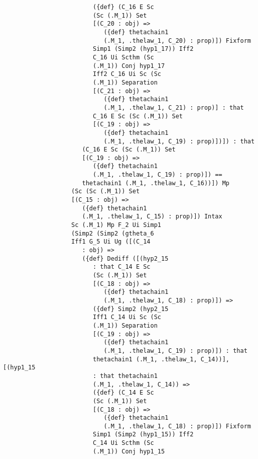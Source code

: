 \documentclass[12pt]{article}
\begin{document}
\begin{verbatim}
                         ({def} (C_16 E Sc 
                         (Sc (.M_1)) Set 
                         [(C_20 : obj) => 
                            ({def} thetachain1 
                            (.M_1, .thelaw_1, C_20) : prop)]) Fixform 
                         Simp1 (Simp2 (hyp1_17)) Iff2 
                         C_16 Ui Scthm (Sc 
                         (.M_1)) Conj hyp1_17 
                         Iff2 C_16 Ui Sc (Sc 
                         (.M_1)) Separation 
                         [(C_21 : obj) => 
                            ({def} thetachain1 
                            (.M_1, .thelaw_1, C_21) : prop)] : that 
                         C_16 E Sc (Sc (.M_1)) Set 
                         [(C_19 : obj) => 
                            ({def} thetachain1 
                            (.M_1, .thelaw_1, C_19) : prop)])]) : that 
                      (C_16 E Sc (Sc (.M_1)) Set 
                      [(C_19 : obj) => 
                         ({def} thetachain1 
                         (.M_1, .thelaw_1, C_19) : prop)]) == 
                      thetachain1 (.M_1, .thelaw_1, C_16))]) Mp 
                   (Sc (Sc (.M_1)) Set 
                   [(C_15 : obj) => 
                      ({def} thetachain1 
                      (.M_1, .thelaw_1, C_15) : prop)]) Intax 
                   Sc (.M_1) Mp F_2 Ui Simp1 
                   (Simp2 (Simp2 (gtheta_6 
                   Iff1 G_5 Ui Ug ([(C_14 
                      : obj) => 
                      ({def} Dediff ([(hyp2_15 
                         : that C_14 E Sc 
                         (Sc (.M_1)) Set 
                         [(C_18 : obj) => 
                            ({def} thetachain1 
                            (.M_1, .thelaw_1, C_18) : prop)]) => 
                         ({def} Simp2 (hyp2_15 
                         Iff1 C_14 Ui Sc (Sc 
                         (.M_1)) Separation 
                         [(C_19 : obj) => 
                            ({def} thetachain1 
                            (.M_1, .thelaw_1, C_19) : prop)]) : that 
                         thetachain1 (.M_1, .thelaw_1, C_14))], [(hyp1_15 
                         : that thetachain1 
                         (.M_1, .thelaw_1, C_14)) => 
                         ({def} (C_14 E Sc 
                         (Sc (.M_1)) Set 
                         [(C_18 : obj) => 
                            ({def} thetachain1 
                            (.M_1, .thelaw_1, C_18) : prop)]) Fixform 
                         Simp1 (Simp2 (hyp1_15)) Iff2 
                         C_14 Ui Scthm (Sc 
                         (.M_1)) Conj hyp1_15 

\end{verbatim}
\end{document}

